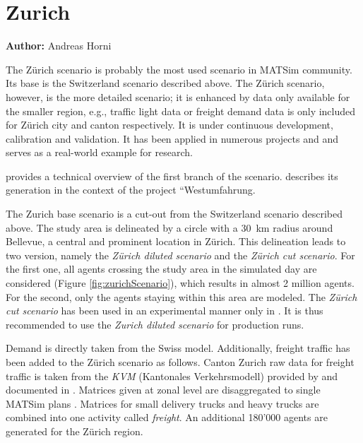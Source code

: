 \section{Zurich}
\label{sec:zhscenario}
\hfill \textbf{Author:} Andreas Horni

The Zürich scenario is probably the most used scenario in MATSim community. Its base is the Switzerland scenario described above. The Zürich scenario, however, is the more detailed scenario; it is enhanced by data only available for the smaller region, e.g., traffic light data or freight demand data is only included for Zürich city and canton respectively. It is under continuous development, calibration and validation. It has been applied in numerous projects and and serves as a real-world example for research.   

\citet{HorniEtAl_TechRep_IVT_2011_a} provides a technical overview of the first branch of the scenario. \citet[][]{BalmerEtAl_ResRep_bdktzrh_2009} describes its generation in the context of the project ``Westumfahrung. 

The Zurich base scenario is a cut-out from the Switzerland scenario described above. The study area is delineated by a circle with a 30~km radius around Bellevue, a central and prominent location in Zürich. This delineation leads to two version, namely the \emph{Zürich diluted scenario} and the \emph{Zürich cut scenario}. For the first one, all agents crossing the study area in the simulated day are considered (Figure \ref{fig:zurichScenario}), which results in almost 2 million agents. For the second, only the agents staying within this area are modeled. The \emph{Zürich cut scenario} has been used in an experimental manner only in \citet[][]{Hackney_PhDThesis_2009}. It is thus recommended to use the \emph{Zurich diluted scenario} for production runs.

Demand is directly taken from the Swiss model. Additionally, freight traffic has been added to the Zürich scenario as follows. Canton Zurich raw data for freight traffic is taken from the \emph{KVM} (Kantonales Verkehrsmodell) provided by \citet{AMV_Webpage_2011} and documented in \citet[][]{GottardiBuergler_SV_1999}. Matrices given at zonal level are disaggregated to single MATSim plans \citep[][]{ShahM_TechRep_IVT_2010}. Matrices for small delivery trucks and heavy trucks are combined into one activity called \emph{freight}. An additional 180'000 agents are generated for the Zürich region.

